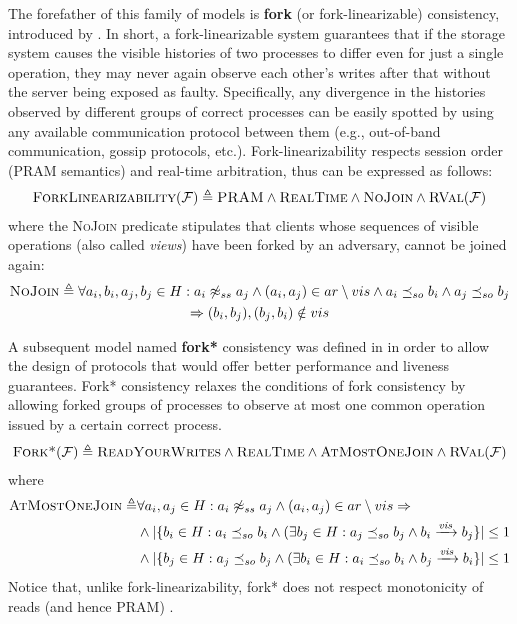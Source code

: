 \documentclass[letter, 11pt]{article}
\newcommand{\RVAL}{\textsc{RVal}(\mathcal{F})}
\newcommand{\citeN}{\citet}
\renewcommand{\cite}{\citep}
\begin{document}
The forefather of this family of models is \textbf{fork} (or fork-linearizable) consistency,
introduced by \citeN{Mazieres.Shasha:02}.
In short, a fork-linearizable system guarantees that if the storage system causes the visible histories of two
processes to differ even for just a single operation, they may never again observe each other's 
writes after that without the server being exposed as faulty.
Specifically, any divergence in the histories observed by different groups of correct processes
can be easily spotted by using any available communication protocol between them
(e.g., out-of-band communication, gossip protocols, etc.). Fork-linearizability respects session order (\textsc{PRAM} semantics) and real-time arbitration, thus can be expressed as follows:
\begin{align}
\textsc{ForkLinearizability}(\mathcal{F}) \triangleq \textsc{PRAM} \wedge \textsc{RealTime} \wedge \textsc{NoJoin} \wedge{\RVAL} 
\end{align}
\noindent where the \textsc{NoJoin} predicate stipulates that clients whose sequences of visible operations (also called \emph{views}) have been forked by an adversary, cannot be joined again:
\begin{multline}
\textsc{NoJoin} \triangleq \forall a_i,b_i,a_j,b_j\in H: 
a_i \not\approx_{ss} a_j \wedge 
(a_i,a_j)\in ar\setminus vis \wedge a_i \preceq_{so} b_i \wedge a_j \preceq_{so} b_j  \\ \Rightarrow 
(b_i,b_j),(b_j,b_i)\notin vis
\end{multline}


A subsequent model named \textbf{fork*} consistency was defined in \cite{Li.Mazieres:07} 
in order to allow the design of protocols that would offer better performance and liveness guarantees.
Fork* consistency relaxes the conditions of fork consistency 
by allowing forked groups of processes to observe at most one common 
operation issued by a certain correct process.
\begin{align}
\textsc{Fork*}(\mathcal{F}) \triangleq \textsc{ReadYourWrites} \wedge \textsc{RealTime} \wedge \textsc{AtMostOneJoin} \wedge{\RVAL} 
\end{align}
\noindent where
\begin{align}
\begin{aligned}
\textsc{AtMostOneJoin} \triangleq & \forall a_i,a_j\in H: 
a_i \not\approx_{ss} a_j \wedge  (a_i,a_j)\in ar\setminus vis \Rightarrow\\ 
 & \wedge |\{ b_i \in H: a_i \preceq_{so} b_i \wedge 
(\exists b_j\in H: a_j \preceq_{so} b_j \wedge b_i\xrightarrow[]{\text{\textit{vis}}}b_j\}| \le 1 \\
 & \wedge |\{ b_j \in H: a_j \preceq_{so} b_j \wedge 
(\exists b_i\in H: a_i \preceq_{so} b_i \wedge b_j\xrightarrow[]{\text{\textit{vis}}}b_i\}| \le 1 
\end{aligned}
\end{align}
Notice that, unlike fork-linearizability, fork* does not respect monotonicity of reads (and hence \textsc{PRAM}) \cite{Cachin.Keidar.ea:11}.
\end{document}
